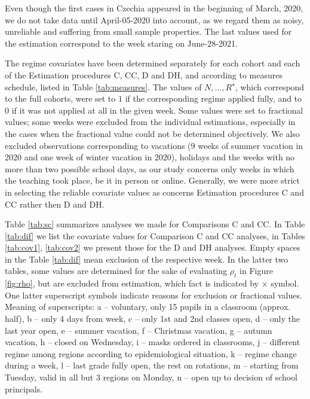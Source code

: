 \documentclass[fleqn,10pt]{wlscirep}
\begin{document}
Even though the first cases in Czechia appeared in the beginning of March, 2020, we do not take data until April-05-2020 into
account, as we regard them as noisy, unreliable
and suffering from small sample properties. The last values used for the estimation correspond to the week staring on June-28-2021.


The regime covariates have been determined separately for each cohort and each of the Estimation procedures C, CC, D and DH, and according to measures schedule, listed in Table \ref{tab:measures}. The values of $N,\dots,R^\star$, which correspond to the full cohorts, were set to $1$ if the corresponding regime applied fully, and to $0$ if it was not applied at all in the given week. Some values were set to fractional values; some weeks were excluded from the individual estimations,  especially in the cases when the fractional value could not be determined objectively. We also excluded observations corresponding to vacations (9 weeks of summer vacation in 2020 and one week of winter vacation in 2020),  holidays and the weeks with no more than two possible school days, as our study concerns only weeks in which the teaching took place, be it in person or online. Generally, we were more strict in selecting the reliable covariate values as concerns Estimation procedures C and CC rather then D and DH. 

Table \ref{tab:sc} summarizes analyses we made for Comparisons C and CC. In Table \ref{tab:dif} we list the covariate values for Comparison C and CC analyses, in Tables \ref{tab:cov1}, \ref{tab:cov2} we present those for the D and DH analyses. Empty spaces in the Table \ref{tab:dif} mean exclusion of the respective week. In the latter two tables, some values are determined for the sake of evaluating $\rho_t$ in Figure \ref{fig:rho}, but are excluded from estimation, which fact is indicated by $\times$ symbol. One latter superscript symbols indicate reasons for exclusion or fractional values. Meaning of superscripts: a -- voluntary, only 15 pupils in a classroom (approx. half), b -- only 4 days from week, c -- only 1st and 2nd classes open, d -- only the last year open, e -- summer vacation, f -- Christmas vacation, g -- autumn vacation,  h -- closed on Wednesday, i -- masks ordered in classrooms, j -- different regime among regions according to epidemiological situation, k -- regime change during a week, l -- last grade fully open, the rest on rotations, m -- starting from Tuesday, valid in all but 3 regions on Monday, n -- open up to decision of school principals.				
\end{document}

